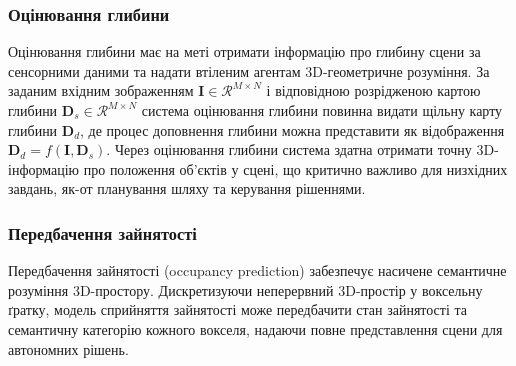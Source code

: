 \subsubsection{Оцінювання глибини}
Оцінювання глибини має на меті отримати інформацію про глибину сцени за сенсорними даними та надати втіленим агентам 3D-геометричне розуміння. За заданим вхідним зображенням $\bm{I} \in \mathcal{R}^{M\times N}$ і відповідною розрідженою картою глибини $\bm{D}_{s} \in \mathcal{R}^{M\times N}$ система оцінювання глибини повинна видати щільну карту глибини $\bm{D}_{d}$, де процес доповнення глибини можна представити як відображення $\bm{D}_d=f(\bm{I}, \bm{D}_{s})$. Через оцінювання глибини система здатна отримати точну 3D-інформацію про положення об'єктів у сцені, що критично важливо для низхідних завдань, як-от планування шляху та керування рішеннями.

\subsubsection{Передбачення зайнятості}
Передбачення зайнятості (occupancy prediction) забезпечує насичене семантичне розуміння 3D-простору. Дискретизуючи неперервний 3D-простір у воксельну ґратку, модель сприйняття зайнятості може передбачити стан зайнятості та семантичну категорію кожного вокселя, надаючи повне представлення сцени для автономних рішень.
